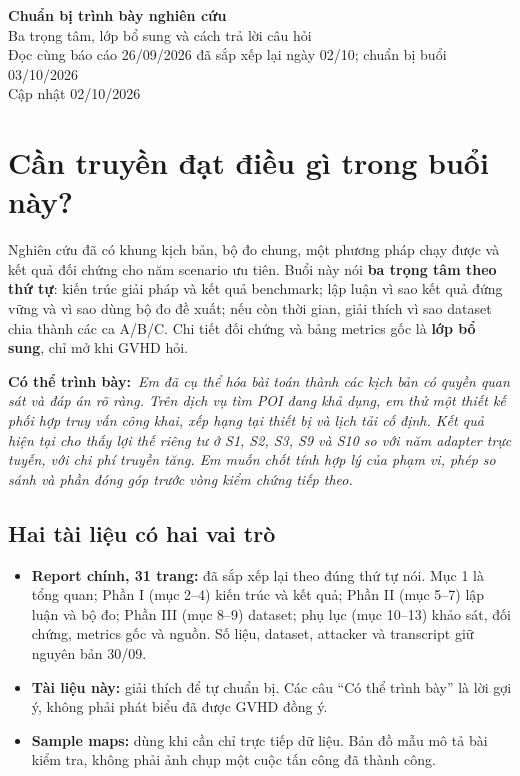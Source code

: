 \documentclass[10pt,a4paper]{article}
\newcommand{\say}[1]{\par\textbf{Có thể trình bày:}\ \textit{#1}\par}
\begin{document}
\begin{center}
{\LARGE\bfseries\color{ink}Chuẩn bị trình bày nghiên cứu}\\[5pt]
{\large Ba trọng tâm, lớp bổ sung và cách trả lời câu hỏi}\\[4pt]
{\small Đọc cùng báo cáo 26/09/2026 đã sắp xếp lại ngày 02/10; chuẩn bị buổi 03/10/2026}\\
{\small Cập nhật 02/10/2026}
\end{center}

\section{Cần truyền đạt điều gì trong buổi này?}
Nghiên cứu đã có khung kịch bản, bộ đo chung, một phương pháp chạy được và kết quả đối chứng cho năm scenario ưu tiên. Buổi này nói \textbf{ba trọng tâm theo thứ tự}: kiến trúc giải pháp và kết quả benchmark; lập luận vì sao kết quả đứng vững và vì sao dùng bộ đo đề xuất; nếu còn thời gian, giải thích vì sao dataset chia thành các ca A/B/C. Chi tiết đối chứng và bảng metrics gốc là \textbf{lớp bổ sung}, chỉ mở khi GVHD hỏi.

\say{Em đã cụ thể hóa bài toán thành các kịch bản có quyền quan sát và đáp án rõ ràng. Trên dịch vụ tìm POI đang khả dụng, em thử một thiết kế phối hợp truy vấn công khai, xếp hạng tại thiết bị và lịch tải cố định. Kết quả hiện tại cho thấy lợi thế riêng tư ở S1, S2, S3, S9 và S10 so với năm adapter trực tuyến, với chi phí truyền tăng. Em muốn chốt tính hợp lý của phạm vi, phép so sánh và phần đóng góp trước vòng kiểm chứng tiếp theo.}

\subsection*{Hai tài liệu có hai vai trò}
\begin{itemize}
\item \textbf{Report chính, 31 trang:} đã sắp xếp lại theo đúng thứ tự nói. Mục 1 là tổng quan; Phần I (mục 2--4) kiến trúc và kết quả; Phần II (mục 5--7) lập luận và bộ đo; Phần III (mục 8--9) dataset; phụ lục (mục 10--13) khảo sát, đối chứng, metrics gốc và nguồn. Số liệu, dataset, attacker và transcript giữ nguyên bản 30/09.
\item \textbf{Tài liệu này:} giải thích để tự chuẩn bị. Các câu ``Có thể trình bày'' là lời gợi ý, không phải phát biểu đã được GVHD đồng ý.
\item \textbf{Sample maps:} dùng khi cần chỉ trực tiếp dữ liệu. Bản đồ mẫu mô tả bài kiểm tra, không phải ảnh chụp một cuộc tấn công đã thành công.
\end{itemize}
\end{document}
